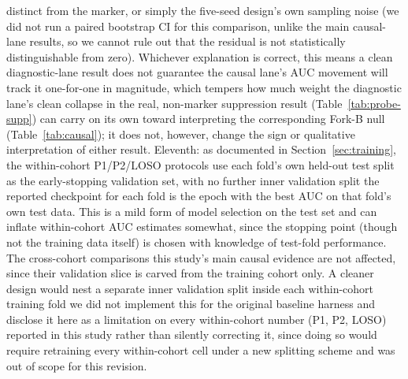 \documentclass[3p,final,10pt]{elsarticle}
\begin{document}
distinct from the marker, or simply the five-seed design's own sampling
noise (we did not run a paired bootstrap CI for this comparison, unlike the
main causal-lane results, so we cannot rule out that the residual is not
statistically distinguishable from zero). Whichever explanation is
correct, this means a clean diagnostic-lane result does not guarantee the
causal lane's AUC movement will track it one-for-one in magnitude, which
tempers how much weight the diagnostic lane's clean collapse in the real,
non-marker suppression result (Table~\ref{tab:probe-supp}) can carry on
its own toward interpreting the corresponding Fork-B null
(Table~\ref{tab:causal}); it does not, however, change the sign or
qualitative interpretation of either result. Eleventh: as documented in
Section~\ref{sec:training}, the within-cohort P1/P2/LOSO protocols use
each fold's own held-out test split as the early-stopping validation set,
with no further inner validation split the reported checkpoint for
each fold is the epoch with the best AUC on that fold's own test data.
This is a mild form of model selection on the test set and can inflate
within-cohort AUC estimates somewhat, since the stopping point (though not
the training data itself) is chosen with knowledge of test-fold
performance. The cross-cohort comparisons this study's main causal
evidence are not affected, since their validation slice is carved from
the training cohort only. A cleaner design would nest a
separate inner validation split inside each within-cohort training fold
we did not implement this for the original baseline harness and disclose
it here as a limitation on every within-cohort number (P1, P2, LOSO)
reported in this study rather than silently correcting it, since doing so
would require retraining every within-cohort cell under a new splitting
scheme and was out of scope for this revision.

\end{document}
